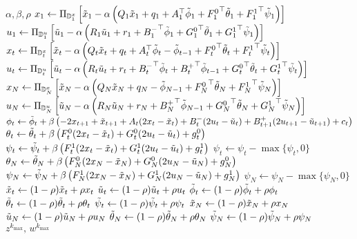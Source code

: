 \documentclass[letterpaper,11pt]{article}
\newcommand{\xpipg}{\textsc{\relsize{-1}x\relsize{1}pipg}}
\begin{document}
\begin{algorithm}[!htpb]
    \caption{Devectorized \xpipg}
    \label{alg:xpipg-devec}
    \begin{algorithmic}[1]
        \Require $\alpha,\beta,\rho$
            \State $x_1 \gets \Pi_{\mathbb{D}_1^x}\left[ \tilde{x}_1 - \alpha \left( Q_1\tilde{x}_1 + q_1 + A_1^\top\tilde{\phi}_1 + {F^0_1}^\top\tilde{\theta}_1 + {F^1_1}^\top\tilde{\psi}_1 \right)  \right]$
            \State $u_1 \gets \Pi_{\mathbb{D}_1^u}\left[ \tilde{u}_1 - \alpha \left( R_1\tilde{u}_1 + r_1 + {B^-_1}^\top\tilde{\phi}_1 + {G^0_1}^\top\tilde{\theta}_1 + {G^1_1}^\top\tilde{\psi}_1 \right) \right]$        
                \State $x_t \gets \Pi_{\mathbb{D}_t^x}\left[ \tilde{x}_t - \alpha \left( Q_t\tilde{x}_t + q_t + A_t^\top\tilde{\phi}_t - \tilde{\phi}_{t-1} + {F^0_t}^\top\tilde{\theta}_t + {F^1_t}^\top\tilde{\psi}_t \right)  \right]$
                \State $u_t \gets \Pi_{\mathbb{D}_t^u}\left[ \tilde{u}_t - \alpha \left( R_t\tilde{u}_t + r_t + {B^-_t}^\top\tilde{\phi}_t + {B^+_{t}}^\top\tilde{\phi}_{t-1} + {G^0_t}^\top\tilde{\theta}_t + {G^1_t}^\top \tilde{\psi}_t \right) \right]$
            \EndFor
            \State $x_N \gets \Pi_{\mathbb{D}_N^x}\left[ \tilde{x}_N - \alpha \left( Q_N\tilde{x}_N + q_N - \tilde{\phi}_{N-1} + {F^0_N}^\top\tilde{\theta}_N + {F^1_N}^\top\tilde{\psi}_N \right)  \right]$
            \State $u_N \gets \Pi_{\mathbb{D}_N^u}\left[ \tilde{u}_N - \alpha \left( R_N\tilde{u}_N + r_N + {B^+_{N}}^\top\tilde{\phi}_{N-1} + {G^0_N}^\top\tilde{\theta}_N + {G^1_N}^\top \tilde{\psi}_N \right) \right]$           
                \State $\phi_t \gets \tilde{\phi}_t + \beta \left( -2x_{t+1}+\tilde{x}_{t+1} + A_t(2x_t-\tilde{x}_t)+B^-_t(2u_t-\tilde{u}_t)+B^+_{t+1}(2u_{t+1}-\tilde{u}_{t+1}) + c_t \right)$
                \State $\theta_t \gets \tilde{\theta}_t + \beta \left( F^0_t(2x_t-\tilde{x}_t) + G^0_t(2u_t-\tilde{u}_t) + g^0_t \right)$
                \State $\psi_t \gets \tilde{\psi}_t + \beta \left( F^1_t(2x_t-\tilde{x}_t) + G^1_t(2u_t-\tilde{u}_t) + g^1_t \right)$ 
                \State $\psi_t \gets \psi_t - \max\{\psi_t,0\}$               
            \EndFor
            \State $\theta_N \gets \tilde{\theta}_N + \beta \left( F^0_N(2x_N-\tilde{x}_N) + G^0_N(2u_N-\tilde{u}_N) + g^0_N \right)$
            \State $\psi_N \gets \tilde{\psi}_N + \beta \left( F^1_N(2x_N-\tilde{x}_N) + G^1_N(2u_N-\tilde{u}_N) + g^1_N \right)$ 
            \State $\psi_N \gets \psi_N - \max\{\psi_N,0\}$
                \State $\tilde{x}_t \gets (1-\rho)\tilde{x}_t + \rho x_t$
                \State $\tilde{u}_t \gets (1-\rho)\tilde{u}_t + \rho u_t$
                \State $\tilde{\phi}_t \gets (1-\rho)\tilde{\phi}_t + \rho \phi_t$
                \State $\tilde{\theta}_t \gets (1-\rho)\tilde{\theta}_t + \rho \theta_t$
                \State $\tilde{\psi}_t \gets (1-\rho)\tilde{\psi}_t + \rho \psi_t$
            \EndFor
            \State $\tilde{x}_N \gets (1-\rho)\tilde{x}_N + \rho x_N$
            \State $\tilde{u}_N \gets (1-\rho)\tilde{u}_N + \rho u_N$
            \State $\tilde{\theta}_N \gets (1-\rho)\tilde{\theta}_N + \rho \theta_N$
            \State $\tilde{\psi}_N \gets (1-\rho)\tilde{\psi}_N + \rho \psi_N$            
        \EndFor
        \Ensure $z^{k_{\max}},\,w^{k_{\max}}$
    \end{algorithmic}
\end{algorithm}
\end{document}
